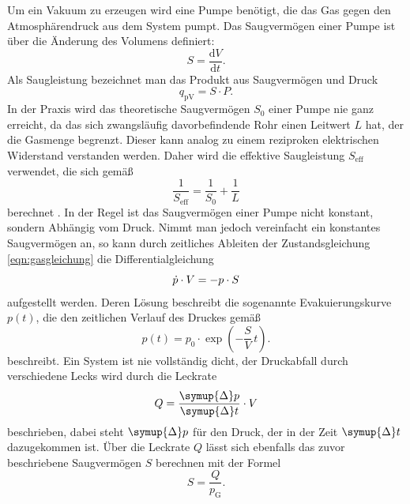 Um ein Vakuum zu erzeugen wird eine Pumpe benötigt, die das Gas gegen den Atmosphärendruck aus dem System pumpt.
Das Saugvermögen einer Pumpe ist über die Änderung des Volumens definiert:
\begin{equation}
    \label{eqn:saugvermoegen}
    S = \frac{\text{d}V}{\text{d}t}.
\end{equation}
Als Saugleistung bezeichnet man das Produkt aus Saugvermögen und Druck
\begin{equation}
    \label{eqn:saugleistung}
    q_{\text{pV}} = S \cdot P.
\end{equation}
In der Praxis wird das theoretische Saugvermögen $S_0$ einer Pumpe nie ganz erreicht, da das sich zwangsläufig davorbefindende
Rohr einen Leitwert $L$ hat, der die Gasmenge begrenzt. Dieser kann analog zu einem reziproken elektrischen Widerstand verstanden werden.
Daher wird die effektive Saugleistung $S_{\text{eff}}$ verwendet, die sich gemäß
\begin{equation}
    \label{eqn:saugleistung_eff}
    \frac{1}{S_{\text{eff}}} = \frac{1}{S_{0}} + \frac{1}{L}
\end{equation}
berechnet \cite{Leitwert}. In der Regel ist das Saugvermögen einer Pumpe nicht konstant, sondern Abhängig vom Druck.
Nimmt man jedoch vereinfacht ein konstantes Saugvermögen an, so kann durch zeitliches Ableiten der Zustandsgleichung \eqref{eqn:gasgleichung}
die Differentialgleichung
\begin{equation}
    \notag
    \dot{p} \cdot V = -p \cdot S
\end{equation}
aufgestellt werden. Deren Lösung beschreibt die sogenannte Evakuierungskurve $p(t)$, die den zeitlichen Verlauf des Druckes gemäß
\begin{equation}
    \label{eqn:evakuierungskurve}
    p(t) = p_0 \cdot \exp{\left(-\frac{S}{V}\,t\right)}.
\end{equation}
beschreibt.
Ein System ist nie vollständig dicht, der Druckabfall durch verschiedene Lecks wird durch die Leckrate
\begin{equation}
    \label{eqn:leckrate}
    Q = \frac{\symup{\Delta} p}{\symup{\Delta} t}\cdot V
\end{equation}
beschrieben, dabei steht $\symup{\Delta} p$ für den Druck, der in der Zeit $\symup{\Delta} t$ dazugekommen ist.
Über die Leckrate $Q$ lässt sich ebenfalls das zuvor beschriebene Saugvermögen $S$ berechnen mit der Formel
\begin{equation}
    \label{eqn:s_leck}
    S = \frac{Q}{p_{\text{G}}}.
\end{equation}
